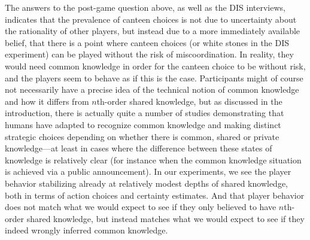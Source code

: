 \documentclass[twocolumn,a4paper,superscriptaddress,nofootinbib]{revtex4}
\newcommand{\tobo}[1]{{\color{red} TOBO: #1}}
\newcommand{\tsn}[1]{{\color{blue} TSN: #1}}
\newcommand{\re}[1]{{\color{brown} RE: #1}}
\begin{document}
The answers to the post-game question above, as well as the DIS interviews, indicates that the prevalence of canteen choices is not due to uncertainty about the rationality of other players, but instead due to a more immediately available belief, that there is a point where canteen choices (or white stones in the DIS experiment) can be played without the risk of miscoordination. In reality, they would need common knowledge in order for the canteen choice to be without risk, and the players seem to behave as if this is the case.
Participants might of course not necessarily have a precise idea of the technical notion of common knowledge and how it differs from $n$th-order shared knowledge, but as discussed in the introduction, there is actually quite a number of studies demonstrating that humans have adapted to recognize common knowledge and making distinct strategic choices depending on whether there is common, shared or private knowledge---at least in cases where the difference between these states of knowledge is relatively clear (for instance when the common knowledge situation is achieved via a public announcement). In our experiments, we see the player behavior stabilizing already at relatively modest depths of shared knowledge, both in terms of action choices and certainty estimates. And that player behavior does not match what we would expect to see if they only believed to have $n$th-order shared knowledge, but instead matches what we would expect to see if they indeed wrongly inferred common knowledge. 
\end{document}
